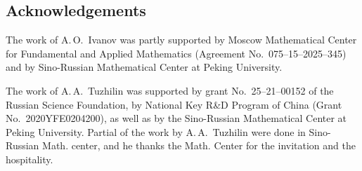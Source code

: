 \documentclass[10pt]{article}
\theoremstyle{plain}
\theoremstyle{definition}
\begin{document}
\subsection*{Acknowledgements}
The work of A.\,O.~Ivanov was partly supported by Moscow Mathematical Center for Fundamental and Applied Mathematics (Agreement No.~075--15--2025--345) and by Sino-Russian Mathematical Center at Peking University.

The work of A.\,A.~Tuzhilin was supported by grant No.~25--21--00152 of the Russian Science Foundation, by National Key R\&D Program of China (Grant No.~2020YFE0204200), as well as by the Sino-Russian Mathematical Center at Peking University. Partial of the work by A.\,A.~Tuzhilin were done in Sino-Russian Math. center, and he thanks the Math. Center for the invitation and the hospitality.
\end{document}
